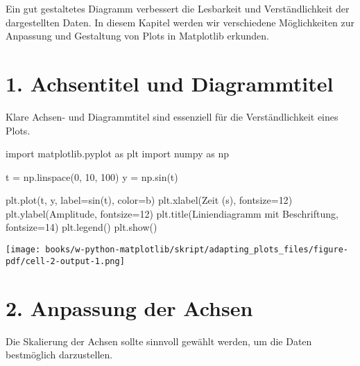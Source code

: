 \documentclass[
  letterpaper,
  DIV=11,
  numbers=noendperiod]{scrreprt}
\newenvironment{Shaded}{\begin{snugshade}}{\end{snugshade}}
\newcommand{\DecValTok}[1]{\textcolor[rgb]{0.68,0.00,0.00}{#1}}
\newcommand{\ImportTok}[1]{\textcolor[rgb]{0.00,0.46,0.62}{#1}}
\newcommand{\NormalTok}[1]{\textcolor[rgb]{0.00,0.23,0.31}{#1}}
\newcommand{\OperatorTok}[1]{\textcolor[rgb]{0.37,0.37,0.37}{#1}}
\newcommand{\StringTok}[1]{\textcolor[rgb]{0.13,0.47,0.30}{#1}}
\begin{document}
\begin{tcolorbox}
Ein gut gestaltetes Diagramm verbessert die Lesbarkeit und
Verständlichkeit der dargestellten Daten. In diesem Kapitel werden wir
verschiedene Möglichkeiten zur Anpassung und Gestaltung von Plots in
Matplotlib erkunden.

\section{1. Achsentitel und
Diagrammtitel}\label{achsentitel-und-diagrammtitel}

Klare Achsen- und Diagrammtitel sind essenziell für die Verständlichkeit
eines Plots.

\begin{Shaded}
\begin{Highlighting}[]
\ImportTok{import}\NormalTok{ matplotlib.pyplot }\ImportTok{as}\NormalTok{ plt}
\ImportTok{import}\NormalTok{ numpy }\ImportTok{as}\NormalTok{ np}

\NormalTok{t }\OperatorTok{=}\NormalTok{ np.linspace(}\DecValTok{0}\NormalTok{, }\DecValTok{10}\NormalTok{, }\DecValTok{100}\NormalTok{)}
\NormalTok{y }\OperatorTok{=}\NormalTok{ np.sin(t)}

\NormalTok{plt.plot(t, y, label}\OperatorTok{=}\StringTok{\textquotesingle{}sin(t)\textquotesingle{}}\NormalTok{, color}\OperatorTok{=}\StringTok{\textquotesingle{}b\textquotesingle{}}\NormalTok{)}
\NormalTok{plt.xlabel(}\StringTok{\textquotesingle{}Zeit (s)\textquotesingle{}}\NormalTok{, fontsize}\OperatorTok{=}\DecValTok{12}\NormalTok{)}
\NormalTok{plt.ylabel(}\StringTok{\textquotesingle{}Amplitude\textquotesingle{}}\NormalTok{, fontsize}\OperatorTok{=}\DecValTok{12}\NormalTok{)}
\NormalTok{plt.title(}\StringTok{\textquotesingle{}Liniendiagramm mit Beschriftung\textquotesingle{}}\NormalTok{, fontsize}\OperatorTok{=}\DecValTok{14}\NormalTok{)}
\NormalTok{plt.legend()}
\NormalTok{plt.show()}
\end{Highlighting}
\end{Shaded}

\texttt{[image: books/w-python-matplotlib/skript/adapting\_plots\_files/figure-pdf/cell-2-output-1.png]}

\section{2. Anpassung der Achsen}\label{anpassung-der-achsen}

Die Skalierung der Achsen sollte sinnvoll gewählt werden, um die Daten
bestmöglich darzustellen.


\end{tcolorbox}
\end{document}
